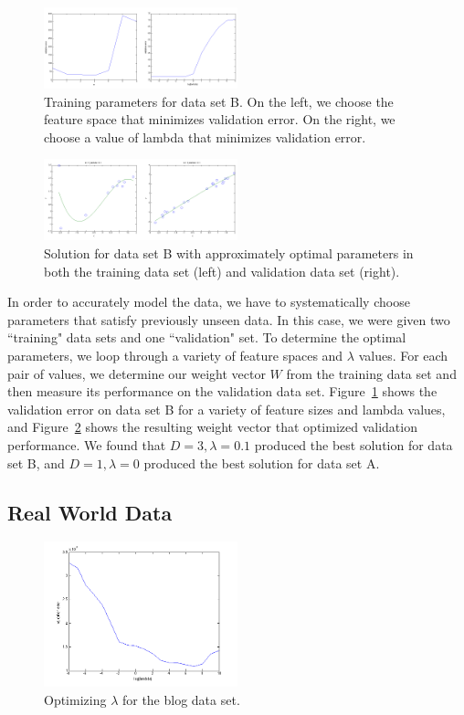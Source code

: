 \documentclass[10pt]{article}   %
\theoremstyle{plain}
\begin{document}
\begin{figure}[h!]\label{fig-training}
  \caption{Training parameters for data set B. On the left, we choose the feature space that minimizes validation error. On the right, we choose a value of lambda that minimizes validation error. }
  \centering
    \includegraphics[width=0.5\textwidth]{figures/3_2_training.png}
\end{figure}

\begin{figure}[h!]\label{fig-result}
  \caption{ Solution  for data set B with approximately optimal parameters in both the training data set (left) and validation data set (right). }
  \centering
    \includegraphics[width=0.5\textwidth]{figures/3_2_result.png}
\end{figure}

In order to accurately model the data, we have to systematically choose parameters that satisfy previously unseen data. In this case, we were given two ``training" data sets and one ``validation" set. To determine the optimal parameters, we loop through a variety of feature spaces and $\lambda$ values. For each pair of values, we determine our weight vector $W$ from the training data set and then measure its performance on the validation data set. Figure~\ref{fig-training} shows the validation error on data set B for a variety of feature sizes and lambda values, and Figure~\ref{fig-result} shows the resulting weight vector that optimized validation performance. We found that $D=3, \lambda=0.1$ produced the best solution for data set B, and $D=1,\lambda=0$ produced the best solution for data set A.
\subsection{Real World Data}
\begin{figure}[h!]\label{fig-blog}
  \caption{ Optimizing $\lambda$ for the blog data set. }
  \centering
    \includegraphics[width=0.5\textwidth]{figures/3_3_choosing_lambda.png}
\end{figure}
\end{document}
